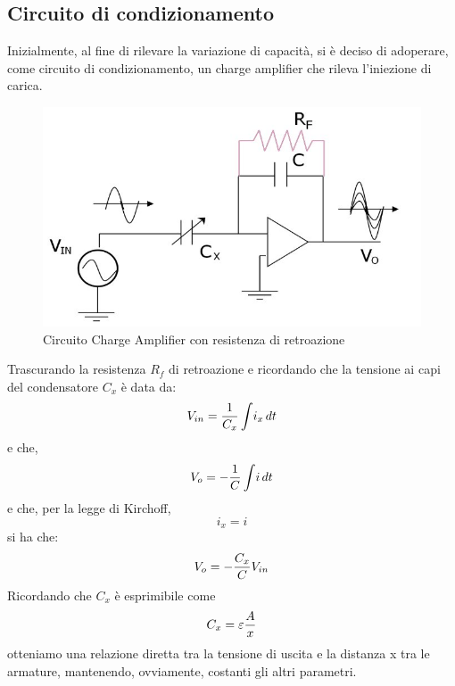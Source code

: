 \documentclass[12pt,a4paper,oneside,openright,italian]{article}
\begin{document}
\subsection{Circuito di condizionamento}
Inizialmente, al fine di rilevare la variazione di capacit\`a, si \`e deciso di adoperare, come circuito di condizionamento, un charge amplifier che rileva l'iniezione di carica.
\begin{figure}[!hbp]
  \centering
  \includegraphics[width=350pt]{immagini/chargeamplifier.jpg}
  \caption{Circuito Charge Amplifier con resistenza di retroazione}
  \label{chargeampl}
\end{figure}
\newline
Trascurando la resistenza $R_f$ di retroazione e ricordando che la tensione ai capi del condensatore $C_x$ \`e data da:
\begin{equation}
V_{in} = {1 \over C_x} \int \! i_x \, dt
\end{equation}
e che,
\begin{equation}
V_o = - { 1\over C} \int \! i \, dt
\end{equation}
e che, per la legge di Kirchoff,
\begin{equation}
i_x = i
\end{equation}
si ha che:
\begin{equation}
V_o = -{C_x \over C} V_{in}
\end{equation}
Ricordando che $C_x$ \`e esprimibile come 
\begin{equation}
C_x = \varepsilon {A \over x}
\end{equation}
otteniamo una relazione diretta tra la tensione di uscita e la distanza x tra le armature, mantenendo, ovviamente, costanti gli altri parametri.  
\newline
\end{document}
